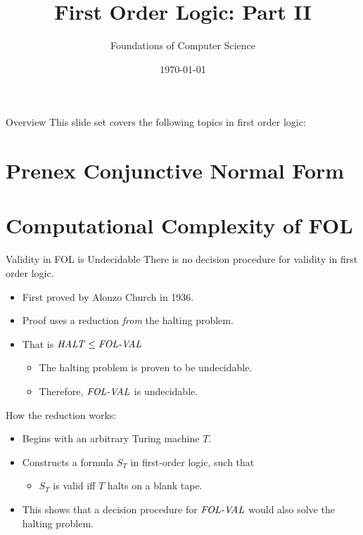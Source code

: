 \documentclass[style=sailor,size=12pt]{powerdot}
\title{First Order Logic: Part II}
\author{Foundations of Computer Science}
\date{\today}
\begin{document}
\maketitle
\begin{slide}[toc=,bm=]{Overview}
This slide set covers the following topics in first order logic:

\vspace{5mm}
\tableofcontents[content=sections]
\end{slide}

\section[]{Prenex Conjunctive Normal Form}


\section[]{Computational Complexity of FOL}
\begin{slide}[bm=,toc=]{Validity in FOL is Undecidable}
There is no decision procedure for validity in first order logic.
\begin{itemize}
\item<2-> First proved by Alonzo Church in 1936.
\item<3-> Proof uses a reduction \emph{from} the halting problem.
\item<4-> That is $\mbox{\it HALT\/} \leq \mbox{\it FOL-VAL\/}$
\begin{itemize}
\item<5-> The halting problem is proven to be undecidable.
\item<6-> Therefore, $\mbox{\it FOL-VAL\/}$ is undecidable.
\end{itemize}
\end{itemize}
\pause[6]
How the reduction works:
\begin{itemize}
\item<8-> Begins with an arbitrary Turing machine $T$.
\item<9-> Constructs a formula $S_T$ in first-order logic, such that
\begin{itemize}
\item<10-> $S_T$ is valid iff $T$ halts on a blank tape.
\end{itemize}
\item<11->This shows that a decision procedure for $\mbox{\it FOL-VAL\/}$ would also solve
the halting problem.
\end{itemize}
\end{slide}
\end{document}
